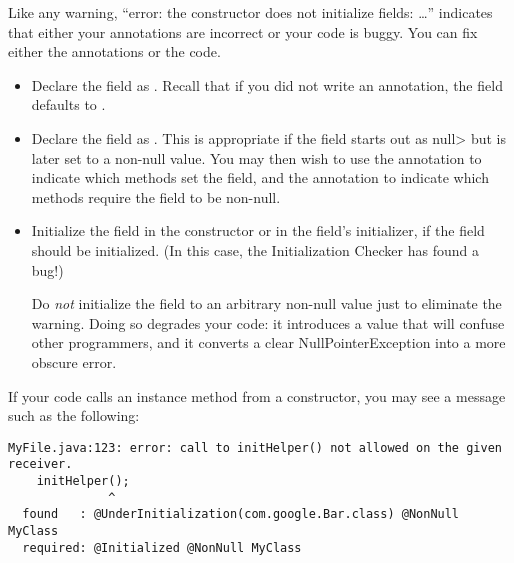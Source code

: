 


Like any warning, ``error:  the constructor does not initialize fields:
\ldots'' indicates that either your annotations are incorrect or your code
is buggy.  You can fix either the annotations or the code.

\begin{itemize}
\item
  Declare the field as .  Recall
  that if you did not write an annotation, the field defaults to
  .
\item
  Declare the field as .
  This is appropriate if the field starts out as \<null> but is later set
  to a non-null value.  You may then wish to use the
   annotation to indicate
  which methods set the field, and the
   annotation to indicate
  which methods require the field to be non-null.
\item
  Initialize the field in the constructor or in the field's initializer, if
  the field should be initialized.  (In this case, the Initialization
  Checker has found a bug!)

  Do \emph{not} initialize the field to an arbitrary non-null value just to
  eliminate the warning.  Doing so degrades your code:  it introduces a
  value that will confuse other programmers, and it converts a clear
  NullPointerException into a more obscure error.
\end{itemize}


If your code calls an instance method from a constructor, you may see a
message such as the following:

\begin{Verbatim}
MyFile.java:123: error: call to initHelper() not allowed on the given receiver.
    initHelper();
              ^
  found   : @UnderInitialization(com.google.Bar.class) @NonNull MyClass
  required: @Initialized @NonNull MyClass
\end{Verbatim}

